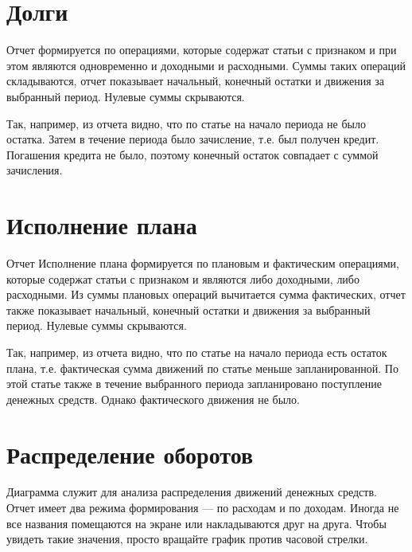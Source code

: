 \documentclass[a4paper,10pt,russian]{sphinxmanual}
\begin{document}
\section{Долги}
\label{\detokenize{reports:id7}}
\sphinxAtStartPar
Отчет формируется по операциями, которые содержат статьи с признаком  и при этом являются
одновременно и доходными и расходными. Суммы таких операций складываются, отчет показывает начальный, конечный
остатки и движения за выбранный период. Нулевые суммы скрываются.

\sphinxAtStartPar
Так, например, из отчета видно, что по статье  на начало периода не было остатка. Затем
в течение периода было зачисление, т.е. был получен кредит. Погашения кредита не было, поэтому конечный
остаток совпадает с суммой зачисления.


\section{Исполнение плана}
\label{\detokenize{reports:id8}}
\sphinxAtStartPar
Отчет Исполнение плана формируется по плановым и фактическим операциями, которые содержат статьи с
признаком  и являются либо доходными, либо расходными. Из суммы плановых операций вычитается
сумма фактических, отчет также показывает начальный, конечный остатки и движения за выбранный период.
Нулевые суммы скрываются.

\sphinxAtStartPar
Так, например, из отчета видно, что по статье  на начало периода есть остаток плана, т.е. фактическая сумма
движений по статье  меньше запланированной. По этой статье также в течение выбранного периода запланировано
поступление денежных средств. Однако фактического движения не было.

\noindent{}

\noindent{}

\noindent{}


\section{Распределение оборотов}
\label{\detokenize{reports:id9}}
\sphinxAtStartPar
Диаграмма служит для анализа распределения движений денежных средств. Отчет имеет два режима формирования —
по расходам и по доходам. Иногда не все названия помещаются на экране или накладываются друг на друга. Чтобы
увидеть такие значения, просто вращайте график против часовой стрелки.
\end{document}
